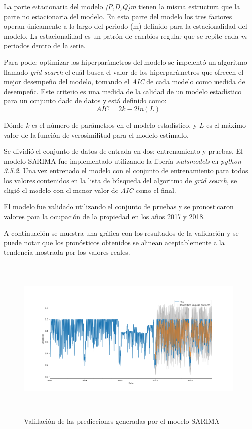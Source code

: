 La parte estacionaria del modelo \emph{(P,D,Q)m} tienen la misma estructura que la parte no estacionaria del modelo. En esta parte del modelo los tres factores operan únicamente a lo largo del periodo (m) definido para la estacionalidad del modelo. La estacionalidad es un patrón de cambios regular que se repite cada \emph{m} periodos dentro de la serie.

Para poder optimizar los hiperparámetros del modelo se impelentó un algoritmo llamado \emph{grid search} el cuál busca el valor de los hiperparámetros que ofrecen el mejor desempeño del modelo, tomando el \emph{AIC} de cada modelo como medida de desempeño. Este criterio es una medida de la calidad de un modelo estadístico para un conjunto dado de datos y está definido como: $$AIC = 2k - 2ln(L)$$

Dónde $k$ es el número de parámetros en el modelo estadístico, y $L$ es el máximo valor de la función de verosimilitud para el modelo estimado.

Se dividió el conjunto de datos de entrada en dos: entrenamiento y pruebas. El modelo SARIMA fue implementado utilizando la libería \emph{statsmodels} en \emph{python 3.5.2}. Una vez entrenado el modelo con el conjunto de entrenamiento para todos los valores contenidos en la lista de búsqueda del algoritmo de \emph{grid search}, se eligió el modelo con el menor valor de \emph{AIC} como el final.

El modelo fue validado utilizando el conjunto de pruebas y se pronosticaron valores para la ocupación de la propiedad en los años 2017 y 2018.

A continuación se muestra una gráfica con los resultados de la validación y se puede notar que los pronósticos obtenidos se alinean aceptablemente a la tendencia mostrada por los valores reales.

\begin{figure}[H]
  \centering
      \includegraphics[width=\maxwidth,height=8cm]{figures/ARIMA_predTest.png}    
  \caption{Validación de las predicciones generadas por el modelo SARIMA}
\end{figure}

